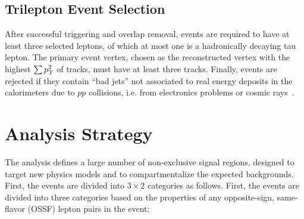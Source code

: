 %
%
%
%

\subsection{Trilepton Event Selection}\label{sec:model-independent-trilepton-event-selection}
After successful triggering and overlap removal, events are required to have at least three selected leptons, of which at most one is a hadronically decaying tau lepton. The primary event vertex, chosen as the reconstructed vertex with the highest $\sum p_{\text{T}}^2$ of tracks, must have at least three tracks. Finally, events are rejected if they contain ``bad jets'' not associated to real energy deposits in the calorimeters due to $pp$ collisions, i.e. from electronics problems or cosmic rays~\cite{jet-cleaning}.


\section{Analysis Strategy}\label{sec:model-independent-analysis-strategy}
The analysis defines a large number of non-exclusive signal regions, designed to target new physics models and to compartmentalize the expected backgrounds. First, the events are divided into $3\times 2$ categories as follows. First, the events are divided into three categories based on the properties of any opposite-sign, same-flavor (OSSF) lepton pairs in the event:

